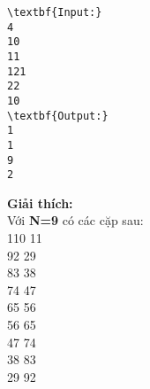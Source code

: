 \begin{verbatim}
\textbf{Input:}
4
10
11
121
22
10
\textbf{Output:}
1
1
9
2\end{verbatim}

\textbf{Giải thích:}
\\Với\textbf{ N=9} có các cặp sau:
\\110 11
\\92 29
\\83 38
\\74 47
\\65 56
\\56 65
\\47 74
\\38 83
\\29 92
